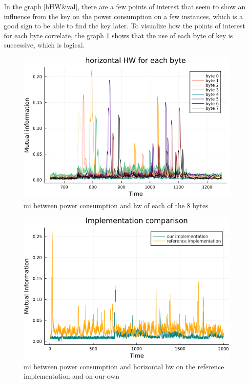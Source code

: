 \documentclass[11pt,technote]{IEEEtran}
\begin{document}
		In the graph \ref{hHW&val}, there are a few points of interest that seem to show an influence from the key on the power consumption on a few instances, which is a good sign to be able to find the key later. To visualize how the points of interest for each byte correlate, the graph \ref{hHW8_zoom} shows that the use of each byte of key is successive, which is logical. 
		
		\begin{figure}[h]
			\centering
			\includegraphics[scale=0.4]{img_files/hHW_8_bytes_zoom}
			\caption{\ac{mi} between power consumption and \ac{hw} of each of the 8 bytes}
			\label{hHW8_zoom}
		\end{figure}

		\begin{figure}[h]
			\centering
			\includegraphics[scale=0.4]{img_files/comp_ref_hHW}
			\caption{\ac{mi} between power consumption and horizontal \ac{hw} on the reference implementation and on our own}
			\label{compref}
		\end{figure}
		
\end{document}
